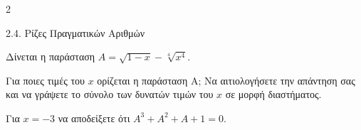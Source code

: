 \begin{ylh}{2}
    \item 2.4. Ρίζες Πραγματικών Αριθμών
\end{ylh}
Δίνεται η παράσταση $A = \sqrt{1 - x} - \sqrt[4]{x^4}$.

\begin{alist}
\item Για ποιες τιμές του $x$ ορίζεται η παράσταση Α; Να αιτιολογήσετε την απάντηση σας και να γράψετε το σύνολο των δυνατών τιμών του $x$ σε μορφή διαστήματος.
\item Για $x = -3$ να αποδείξετε ότι $A^3 + A^2 + A + 1 = 0$.
\end{alist}

